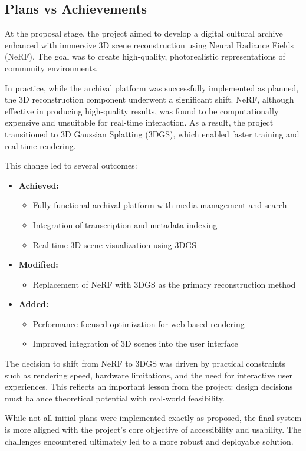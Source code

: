 \subsection{Plans vs Achievements}

At the proposal stage, the project aimed to develop a digital cultural archive enhanced with immersive 3D scene reconstruction using Neural Radiance Fields (NeRF). The goal was to create high-quality, photorealistic representations of community environments.

In practice, while the archival platform was successfully implemented as planned, the 3D reconstruction component underwent a significant shift. NeRF, although effective in producing high-quality results, was found to be computationally expensive and unsuitable for real-time interaction. As a result, the project transitioned to 3D Gaussian Splatting (3DGS), which enabled faster training and real-time rendering.

This change led to several outcomes:
\begin{itemize}
    \item \textbf{Achieved:}
    \begin{itemize}
        \item Fully functional archival platform with media management and search
        \item Integration of transcription and metadata indexing
        \item Real-time 3D scene visualization using 3DGS
    \end{itemize}

    \item \textbf{Modified:}
    \begin{itemize}
        \item Replacement of NeRF with 3DGS as the primary reconstruction method
    \end{itemize}

    \item \textbf{Added:}
    \begin{itemize}
        \item Performance-focused optimization for web-based rendering
        \item Improved integration of 3D scenes into the user interface
    \end{itemize}
\end{itemize}

The decision to shift from NeRF to 3DGS was driven by practical constraints such as rendering speed, hardware limitations, and the need for interactive user experiences. This reflects an important lesson from the project: design decisions must balance theoretical potential with real-world feasibility.

While not all initial plans were implemented exactly as proposed, the final system is more aligned with the project's core objective of accessibility and usability. The challenges encountered ultimately led to a more robust and deployable solution.